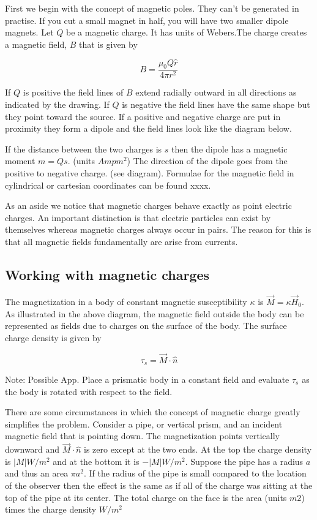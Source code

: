 \documentclass{article}
\begin{document}
First we begin with the concept of magnetic poles. They can't be generated in practise. If you cut a small magnet in half, you will have two smaller dipole magnets. Let $Q$ be a magnetic charge. It has units of Webers.The charge creates a magnetic field, $B$ that is given by


\begin{equation}
B=  \frac{ \mu_0 Q \hat r}{4\pi r^2}
\end{equation}

If $Q$ is positive the field lines of $B$ extend radially outward in all directions as indicated by the drawing. If $Q$ is negative the field lines have the same shape but they point toward the source. If a positive and negative charge are put in proximity they form a dipole and the field lines look like the diagram below.


\bigskip

If the distance between the two charges is $s$ then the dipole has a magnetic moment $m=Qs$. (units $Amp m^2$) The direction of the dipole goes from the positive to negative charge. (see diagram). Formulae for the magnetic field in cylindrical or cartesian coordinates can be found xxxx.

\bigskip

As an aside we notice that magnetic charges behave exactly as point electric charges. An important distinction is that electric particles can exist by themselves whereas magnetic charges always occur in pairs. The reason for this is that all magnetic fields fundamentally are arise from currents.


\subsection{Working with magnetic charges}

The magnetization in a body of constant magnetic susceptibility $\kappa$ is $\vec M = \kappa \vec H_0$. As illustrated in the above diagram, the magnetic field outside the body can be represented as fields  due to charges on the surface of the body. The surface charge density is given by


\begin{equation}
\tau_s= \vec M \cdot \hat n
\end{equation}

Note:  Possible App. Place a prismatic body in a  constant field and evaluate $\tau_s$ as the body is rotated with respect to the field.

There are some circumstances in which the concept of magnetic charge greatly simplifies the problem. Consider a pipe, or vertical prism, and an incident magnetic field that is pointing down. The magnetization points vertically downward and $\vec{M} \cdot \hat n$ is zero except at the two ends. At the top the charge density is $|M| W/m^2$ and at the bottom it is $-|M| W/m^2$. Suppose the pipe has a radius $a$ and thus an area $\pi a^2$. If the radius of the pipe is small compared to the location of the observer then the effect is the same as if all of the charge was sitting at the top of the pipe at its center. The total charge on the face is the area (units $m2$) times the charge density $W/m^2$
\end{document}
